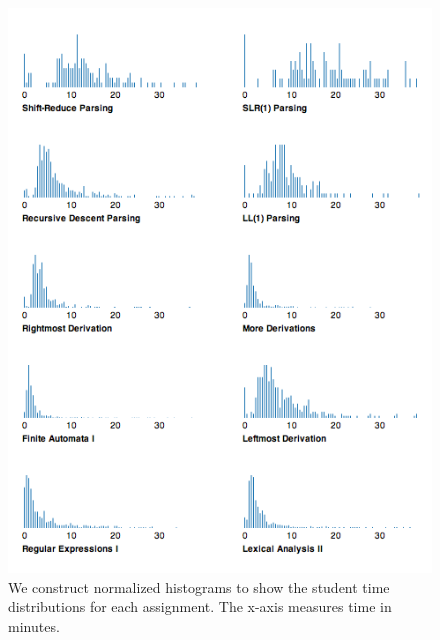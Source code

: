\documentclass{sigchi}
\begin{document}
\begin{figure}[!h]
\centering
\includegraphics[width=1\columnwidth]{distributions}
\caption{We construct normalized histograms to show the student time distributions for each assignment. The x-axis measures time in minutes.}
\label{fig:distributions}
\end{figure}
\end{document}
